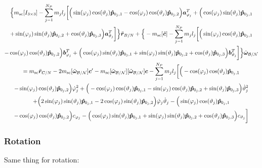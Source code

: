\begin{multline}
	\Big\{m_{\text{sc}}[I_{3\times3}] -\sum_{j=1}^{N_{P}}m_j l_j \bigg[
	\Big(\sin(\varphi_j)\cos(\vartheta_j)\bm{\hat{p}}_{0_j,1}-\cos(\varphi_j)\cos(\vartheta_j)\bm{\hat{p}}_{0_j,2}\Big)\bm a_{\varphi_j}^T +\Big(\cos(\varphi_j)\sin(\vartheta_j)\bm{\hat{p}}_{0_j,1}\\+\sin(\varphi_j)\sin(\vartheta_j)\bm{\hat{p}}_{0_j,2}+\cos(\vartheta_j)\bm{\hat{p}}_{0_j,3}\Big)\bm a_{\vartheta_j}^T \bigg]\Big\}\ddot{\bm r}_{B/N}
	+\Big\{-m_{\text{sc}}[\tilde{\bm{c}}] -\sum_{j=1}^{N_{P}}m_j l_j \bigg[
	\Big(\sin(\varphi_j)\cos(\vartheta_j)\bm{\hat{p}}_{0_j,1}\\-\cos(\varphi_j)\cos(\vartheta_j)\bm{\hat{p}}_{0_j,2}\Big)\bm b_{\varphi_j}^T +\Big(\cos(\varphi_j)\sin(\vartheta_j)\bm{\hat{p}}_{0_j,1}+\sin(\varphi_j)\sin(\vartheta_j)\bm{\hat{p}}_{0_j,2}+\cos(\vartheta_j)\bm{\hat{p}}_{0_j,3}\Big)\bm b_{\vartheta_j}^T \bigg] \Big\}\dot{\bm\omega}_{\cal B/N}
	\\= m_{\text{sc}}\ddot{\bm r}_{C/N} - 2m_{\text{sc}}[\tilde{\bm\omega}_{\cal B/N}] \bm c'
	-m_{\text{sc}}[\tilde{\bm\omega}_{\cal B/N}][\tilde{\bm\omega}_{\cal B/N}]\bm{c}
	-\sum_{j=1}^{N_{P}}m_j l_j \bigg[
	\Big(-\cos(\varphi_j)\cos(\vartheta_j)\bm{\hat{p}}_{0_j,1}\\-\sin(\varphi_j)\cos(\vartheta_j)\bm{\hat{p}}_{0_j,2}\Big)\dot{\varphi}_j^2
	+\Big(-\cos(\varphi_j)\cos(\vartheta_j)\bm{\hat{p}}_{0_j,1}-\sin(\varphi_j)\cos(\vartheta_j)\bm{\hat{p}}_{0_j,2}+\sin(\vartheta_j)\bm{\hat{p}}_{0_j,3} \Big)\dot{\vartheta}_j^2 \\+
	\Big(2\sin(\varphi_j)\sin(\vartheta_j)\bm{\hat{p}}_{0_j,1} -2\cos(\varphi_j)\sin(\vartheta_j)\bm{\hat{p}}_{0_j,2}\Big)\dot{\varphi}_j\dot{\vartheta}_j
	-\Big(\sin(\varphi_j)\cos(\vartheta_j)\bm{\hat{p}}_{0_j,1}\\-\cos(\varphi_j)\cos(\vartheta_j)\bm{\hat{p}}_{0_j,2}\Big)c_{\varphi_j} - \Big(\cos(\varphi_j)\sin(\vartheta_j)\bm{\hat{p}}_{0_j,1}+\sin(\varphi_j)\sin(\vartheta_j)\bm{\hat{p}}_{0_j,2}+\cos(\vartheta_j)\bm{\hat{p}}_{0_j,3}\Big) c_{\vartheta_j}
	\bigg]
	\label{eq:Rbddot7}
\end{multline}

\subsubsection{Rotation}

Same thing for rotation:

